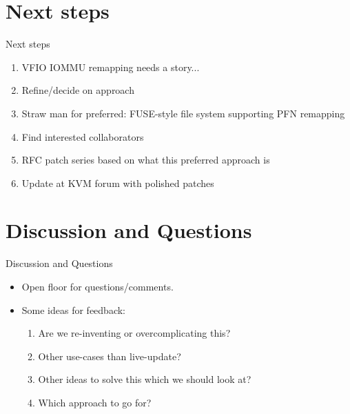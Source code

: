 \documentclass{beamer}
\begin{document}
\section{Next steps}

\begin{frame}{Next steps}
  \begin{enumerate}
    \item VFIO IOMMU remapping needs a story...
    \item Refine/decide on approach
    \item Straw man for preferred: FUSE-style file system supporting PFN remapping
    \item Find interested collaborators
    \item RFC patch series based on what this preferred approach is
    \item Update at KVM forum with polished patches
  \end{enumerate}
\end{frame}

\section{Discussion and Questions}

\begin{frame}{Discussion and Questions}
  \begin{itemize}
    \item Open floor for questions/comments.
    \item Some ideas for feedback:
      \begin{enumerate}
        \item Are we re-inventing or overcomplicating this?
        \item Other use-cases than live-update?
        \item Other ideas to solve this which we should look at?
        \item Which approach to go for?
      \end{enumerate}
  \end{itemize}
\end{frame}
\end{document}
